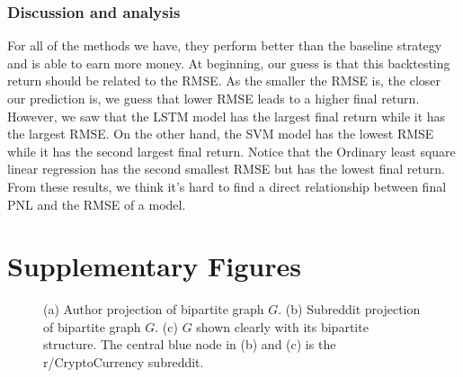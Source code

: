 \documentclass[twoside]{report}
\begin{document}
\begin{spacing}{1}
\subsection{Discussion and analysis}
For all of the methods we have, they perform better than the baseline strategy and is able to earn more money. At beginning, our guess is that this backtesting return should be related to the RMSE. As the smaller the RMSE is, the closer our prediction is, we guess that lower RMSE leads to a higher final return. However, we saw that the LSTM model has the largest final return while it has the largest RMSE. On the other hand, the SVM model has the lowest RMSE while it has the second largest final return. Notice that the Ordinary least square linear regression has the second smallest RMSE but has the lowest final return. From these results, we think it's hard to find a direct relationship between final PNL and the RMSE of a model.






















\appendix
\chapter{Supplementary Figures}\label{app:supplementary figures}

\begin{figure}[h]
\begin{minipage}{.5\linewidth}
\centering
{}
\end{minipage}%
\begin{minipage}{.5\linewidth}
\centering
{}
\end{minipage}\par\medskip
\centering
{}
\caption{(a) Author projection of bipartite graph $G$. (b) Subreddit projection of bipartite graph $G$. (c) $G$ shown clearly with its bipartite structure. The central blue node in (b) and (c) is the r/CryptoCurrency subreddit.}
\label{fig:bipartite}
\end{figure}








\end{spacing}
\end{document}
